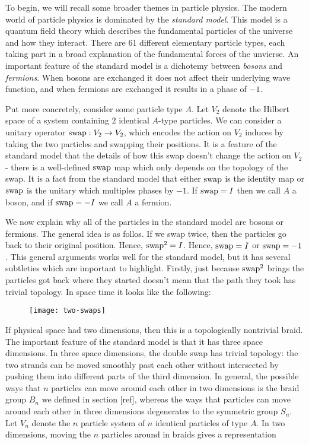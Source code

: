 To begin, we will recall some broader themes in particle physics. The modern world of particle physics is dominated by the \textit{standard model}. This model is a quantum field theory which describes the fundamental particles of the universe and how they interact. There are 61 different elementary particle types, each taking part in a broad explanation of the fundamental forces of the unvierse. An important feature of the standard model is a dichotemy between \textit{bosons} and \textit{fermions}. When bosons are exchanged it does not affect their underlying wave function, and when fermions are exchanged it results in a phase of $-1$.

Put more concretely, consider some particle type $A$. Let $V_2$ denote the Hilbert space of a system containing $2$ identical $A$-type particles. We can consider a unitary operator $\operatorname{swap}:V_2\to V_2$, which encodes the action on $V_2$ induces by taking the two particles and swapping their positions. It is a feature of the standard model that the details of how this swap doesn't change the action on $V_2$ - there is a well-defined $\operatorname{swap}$ map which only depends on the topology of the swap. It is a fact from the standard model that either $\operatorname{swap}$ is the identity map or $\operatorname{swap}$ is the unitary which multiples phases by $-1$. If $\operatorname{swap}=I$ then we call $A$ a boson, and if $\operatorname{swap}=-I$ we call $A$ a fermion.

We now explain why all of the particles in the standard model are bosons or fermions. The general idea is as follos. If we swap twice, then the particles go back to their original position. Hence, $\operatorname{swap}^2=I$. Hence, $\operatorname{swap}=I$ or $\operatorname{swap}=-1$. This general arguments works well for the standard model, but it has several subtleties which are important to highlight. Firstly, just because $\operatorname{swap}^2$ brings the particles got back where they started doesn't mean that the path they took has trivial topology. In space time it looks like the following:

\begin{figure}[h]
\begin{center}
\texttt{[image: two-swaps]}
\end{center}
\end{figure}

If physical space had two dimensions, then this is a topologically nontrivial braid. The important feature of the standard model is that it has three space dimensions. In three space dimensions, the double swap has trivial topology: the two strands can be moved smoothly past each other without intersected by pushing them into different parts of the third dimension. In general, the possible ways that $n$ particles can move around each other in two dimensions is the braid group $B_n$ we defined in section [ref], whereas the ways that particles can move around each other in three dimensions degenerates to the symmetric group $S_n$. Let $V_n$ denote the $n$ particle system of $n$ identical particles of type $A$. In two dimensions, moving the $n$ particles around in braids gives a representation

